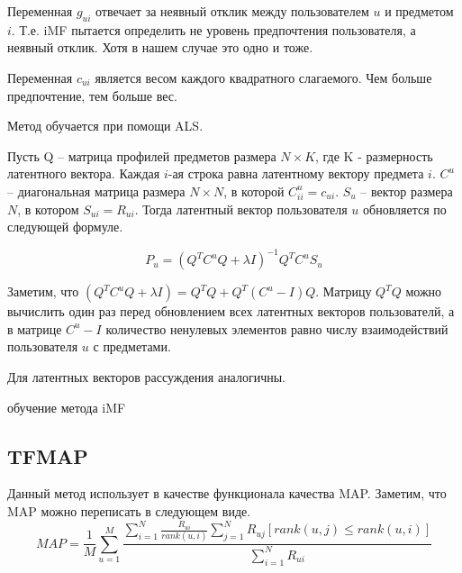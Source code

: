 \documentclass[a4paper,12pt]{article}
\begin{document}
Переменная $g_{ui}$ отвечает за неявный отклик между пользователем $u$ и предметом $i$. Т.е. iMF пытается определить не уровень предпочтения пользователя, а неявный отклик. Хотя в нашем случае это одно и тоже. 

Переменная $c_{ui}$ является весом каждого квадратного слагаемого. Чем больше предпочтение, тем больше вес. 

Метод обучается при помощи ALS\cite{matrixfactorization}. 

Пусть Q -- матрица профилей предметов размера $N \times K$, где K - размерность латентного вектора. Каждая $i$-ая  строка равна латентному вектору предмета $i$.  $C^u$ -- диагональная матрица размера $N \times N$, в которой $C_{ii}^u = c_{ui}$. $S_u$ -- вектор размера $N$, в котором $S_{ui} = R_{ui}$. Тогда латентный вектор пользователя $u$ обновляется по следующей формуле.

\begin{equation*}
	P_u = (Q^TC^uQ + \lambda I) ^ {-1}Q^TC^uS_u
\end{equation*} 

Заметим, что $(Q^TC^uQ + \lambda I) = Q^TQ + Q^T(C^u - I)Q $. Матрицу $Q^TQ$ можно вычислить один раз перед обновлением всех латентных векторов пользователй, а в матрице $C^u - I$ количество ненулевых элементов равно числу взаимодействий пользователя $u$ с предметами.

Для латентных векторов рассуждения аналогичны.

\begin{algorithm}[h]
\caption{обучение метода iMF}
\begin{algorithmic}[1]
\Repeat {} 
	\EndFor
	\EndFor
{}

\end{algorithmic}
\label{alg:climf}
\end{algorithm}


%

\subsection{TFMAP}
Данный метод использует в качестве функционала качества MAP. Заметим, что MAP можно переписать в следующем виде. 
\begin{equation*}
 MAP = \frac{1}{M}\sum_{u=1}^M\frac{\sum_{i=1}^N \frac{R_{ui}}{rank(u, i)} \sum_{j=1}^N R_{uj} 
 [rank(u,j) \leq rank(u, i)]}{\sum_{i=1}^N R_{ui}} 
\end{equation*} 
 
\end{document}
